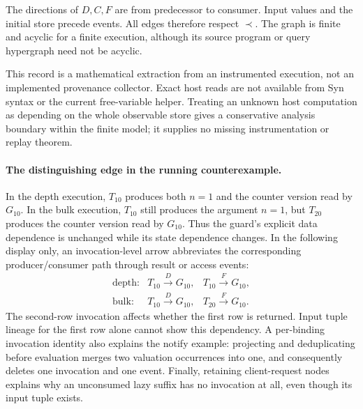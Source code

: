 The directions of $D,C,F$ are from predecessor to consumer. Input values and
the initial store precede events. All edges therefore respect $\prec$.
The graph is finite and acyclic for a finite execution, although its source
program or query hypergraph need not be acyclic.

This record is a mathematical extraction from an instrumented execution, not
an implemented provenance collector. Exact host reads are not available from
Syn syntax or the current free-variable helper. Treating an unknown host
computation as depending on the whole observable store gives a conservative
analysis boundary within the finite model; it supplies no missing
instrumentation or replay theorem.

\paragraph{The distinguishing edge in the running counterexample.}
In the depth execution, $T_{10}$ produces both $n=1$ and the counter version
read by $G_{10}$. In the bulk execution, $T_{10}$ still produces the argument
$n=1$, but $T_{20}$ produces the counter version read by $G_{10}$. Thus the
guard's explicit data dependence is unchanged while its state dependence
changes. In the following display only, an invocation-level arrow abbreviates
the corresponding producer/consumer path through result or access events:
\[
\begin{array}{lll}
 \text{depth:}&T_{10}\xrightarrow{D}G_{10},&T_{10}\xrightarrow{F}G_{10},\\
 \text{bulk:}&T_{10}\xrightarrow{D}G_{10},&T_{20}\xrightarrow{F}G_{10}.
\end{array}
\]
The second-row invocation affects whether the first row is returned. Input
tuple lineage for the first row alone cannot show this dependency. A
per-binding invocation identity also explains the notify example: projecting
and deduplicating before evaluation merges two valuation occurrences into one,
and consequently deletes one invocation and one event. Finally, retaining
client-request nodes explains why an unconsumed lazy suffix has no invocation
at all, even though its input tuple exists.

